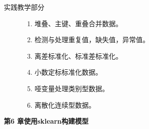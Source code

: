 \documentclass[12pt,a4paper,openany,cap]{ctexbook}
\begin{document}
\begin{description}
\item[实践教学部分]
  \begin{minipage}[t]{0.8\linewidth}
    \begin{enumerate}
    \item 堆叠、主键、重叠合并数据。
\item\label{item:165}  检测与处理重复值，缺失值，异常值。
\item\label{item:166}  离差标准化、标准差标准化。
\item\label{item:167}  小数定标标准化数据。
\item\label{item:168}  哑变量处理类别型数据。
\item\label{item:169}  离散化连续型数据。
    \end{enumerate}
  \end{minipage}
\end{description}


\begin{center}
   \textbf{第6 章\quad 使用sklearn构建模型}
\end{center}
\end{document}
